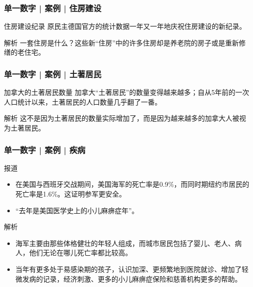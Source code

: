 \begin{frame}
  \frametitle{单一数字 | 案例 | 住房建设}
  \begin{block}{住房建设纪录}
    原民主德国官方的统计数据一年又一年地庆祝住房建设的新纪录。
  \end{block}
  \pause
  \begin{block}{解析}
    一套住房是什么？这些新“住房”中的许多住房却是养老院的房子或是重新修缮的老住宅。
  \end{block}
\end{frame}

\begin{frame}
  \frametitle{单一数字 | 案例 | 土著居民}
  \begin{block}{加拿大的土著居民数量}
    加拿大“土著居民”的数量变得越来越多；自从5年前的一次人口统计以来，土著居民的人口数量几乎翻了一番。
  \end{block}
  \pause
  \begin{block}{解析}
    这不是因为土著居民的数量实际增加了，而是因为越来越多的加拿大人被视为土著居民。
  \end{block}
\end{frame}

\begin{frame}
  \frametitle{单一数字 | 案例 | 疾病}
  \begin{block}{报道}
    \begin{itemize}
      \item 在美国与西班牙交战期间，美国海军的死亡率是0.9\%，而同时期纽约市居民的死亡率是1.6\%。这证明参军更安全。
      \item “去年是美国医学史上的小儿麻痹症年”。
    \end{itemize}
  \end{block}
  \pause
  \begin{block}{解析}
    \begin{itemize}
      \item 海军主要由那些体格健壮的年轻人组成，而城市居民包括了婴儿、老人、病人，他们无论在哪儿死亡率都比较高。
      \item 当年有更多处于易感染期的孩子，认识加深、更频繁地到医院就诊、增加了轻微发病的记录，经济刺激、更多的小儿麻痹症保险和慈善机构更多的帮助。
    \end{itemize}
  \end{block}
\end{frame}

